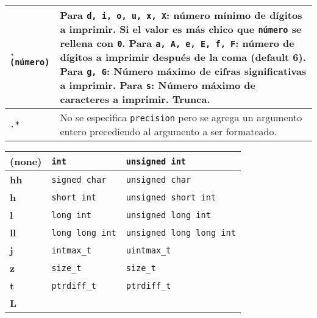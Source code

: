 \begin{center}
\vspace{0.2cm}

\tabletail{\hline}
\tablelasttail{\hline} 
\footnotesize
{
\begin{xtabular}{|C{.2\columnwidth}|L{.8\columnwidth}|}
\texttt{.(n\'umero)} & Para \texttt{d, i, o, u, x, X}: n\'umero m\'inimo de d\'igitos a imprimir. Si el valor es m\'as chico que \texttt{n\'umero} se rellena con \texttt{0}. \newline Para \texttt{a, A, e, E, f, F}: n\'umero de d\'igitos a imprimir despu\'es de la coma (default 6). \newline Para \texttt{g, G}: N\'umero m\'aximo de cifras significativas a imprimir. \newline Para \texttt{s}: N\'umero m\'aximo de caracteres a imprimir. Trunca. \\ \hline
\texttt{.*}          & No se especifica \texttt{precision} pero se agrega un argumento entero precediendo al argumento a ser formateado. \\
\end{xtabular}
}

\vspace{0.2cm}

\tabletail{\hline}
\tablelasttail{\hline}
\footnotesize
{
\begin{xtabular}[!]{|C{.15\columnwidth}|C{.425\columnwidth}|C{.425\columnwidth}|}
\textbf{(none)} & \texttt{int}           & \texttt{unsigned int}            \\ \hline
\textbf{hh}     & \texttt{signed char}   & \texttt{unsigned char}           \\ \hline
\textbf{h}      & \texttt{short int}     & \texttt{unsigned short int}      \\ \hline
\textbf{l}      & \texttt{long int}      & \texttt{unsigned long int}       \\ \hline
\textbf{ll}     & \texttt{long long int} & \texttt{unsigned long long int}  \\ \hline
\textbf{j}      & \texttt{intmax\_t}     & \texttt{uintmax\_t}              \\ \hline
\textbf{z}      & \texttt{size\_t}       & \texttt{size\_t}                 \\ \hline
\textbf{t}      & \texttt{ptrdiff\_t}    & \texttt{ptrdiff\_t}              \\ \hline
\textbf{L}      &                        &                                  \\      
\end{xtabular}
}


\end{center}
